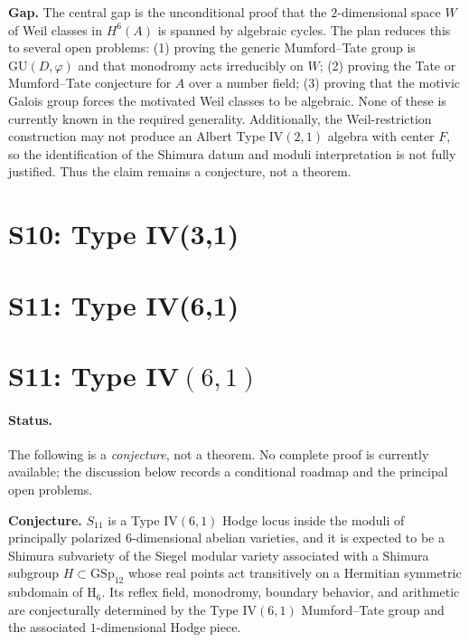 \documentclass{article}
\newcommand{\mathbb}[1]{\mathrm{#1}}
\begin{document}
\medskip
\noindent\textbf{Gap.} The central gap is the unconditional proof that the
$2$-dimensional space $W$ of Weil classes in $H^6(A)$ is spanned by algebraic cycles.
The plan reduces this to several open problems: (1) proving the generic
Mumford--Tate group is $\mathrm{GU}(D,\varphi)$ and that monodromy acts irreducibly on
$W$; (2) proving the Tate or Mumford--Tate conjecture for $A$ over a number field;
(3) proving that the motivic Galois group forces the motivated Weil classes to be
algebraic. None of these is currently known in the required generality. Additionally,
the Weil-restriction construction may not produce an Albert Type IV$(2,1)$ algebra
with center $F$, so the identification of the Shimura datum and moduli interpretation
is not fully justified. Thus the claim remains a conjecture, not a theorem.

\section{S10: Type IV(3,1)}

\section{S11: Type IV(6,1)}
\section*{S11: Type IV$(6,1)$}

\paragraph{Status.}
The following is a \emph{conjecture}, not a theorem. No complete proof is currently available; the discussion below records a conditional roadmap and the principal open problems.

\medskip
\noindent\textbf{Conjecture.}
$S_{11}$ is a Type IV$(6,1)$ Hodge locus inside the moduli of principally polarized $6$-dimensional abelian varieties, and it is expected to be a Shimura subvariety of the Siegel modular variety associated with a Shimura subgroup $H \subset \mathrm{GSp}_{12}$ whose real points act transitively on a Hermitian symmetric subdomain of $\mathbb{H}_6$. Its reflex field, monodromy, boundary behavior, and arithmetic are conjecturally determined by the Type IV$(6,1)$ Mumford--Tate group and the associated $1$-dimensional Hodge piece.
\end{document}

